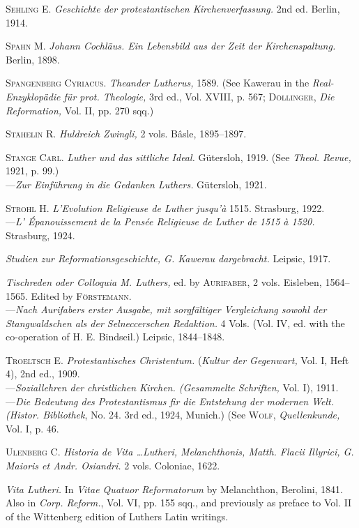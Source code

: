 \textsc{Sehling E.} \textit{Geschichte der protestantischen Kirchenverfassung.} 2nd ed.
Berlin, 1914.

\textsc{Spahn M.} \textit{Johann Cochläus. Ein Lebensbild aus der Zeit der Kirchenspaltung.}
Berlin, 1898.

\textsc{Spangenberg Cyriacus.} \textit{Theander Lutherus,} 1589. (See Kawerau in the
\textit{Real-Enzyklopädie für prot. Theologie,} 3rd ed., Vol. XVIII, p. 567; \textsc{Döllinger},
\textit{Die Reformation,} Vol. II, pp. 270 sqq.)

\textsc{Stähelin R.} \textit{Huldreich Zwingli,} 2 vols. Bâsle, 1895--1897.

\textsc{Stange Carl.} \textit{Luther und das sittliche Ideal.} Gütersloh, 1919. (See \textit{Theol.
Revue,} 1921, p. 99.) \\
---\textit{Zur Einführung in die Gedanken Luthers.} Gütersloh, 1921.

\textsc{Strohl H.} \textit{L’Evolution Religieuse de Luther jusqu'à} 1515. Strasburg,
1922. \\
---\textit{L’ Épanouissement de la Pensée Religieuse de Luther de 1515 à 1520.}
Strasburg, 1924.

\textit{Studien zur Reformationsgeschichte, G. Kawerau dargebracht.} Leipsic, 1917.

\textit{Tischreden oder Colloquia M. Luthers,} ed. by \textsc{Aurifaber,} 2 vols. Eisleben,
1564--1565. Edited by \textsc{Förstemann.} \\
---\textit{Nach Aurifabers erster Ausgabe, mit sorgfältiger Vergleichung sowohl
der Stangwaldschen als der Selneccerschen Redaktion.} 4 Vols. (Vol. IV, ed.
with the co-operation of H. E. Bindseil.) Leipsic, 1844--1848.

\textsc{Troeltsch E.} \textit{Protestantisches Christentum.} (\textit{Kultur der Gegenwart,} Vol.
I, Heft 4), 2nd ed., 1909. \\
---\textit{Soziallehren der christlichen Kirchen. (Gesammelte Schriften,} Vol. I),
1911. \\
---\textit{Die Bedeutung des Protestantismus fir die Entstehung der modernen
Welt. (Histor. Bibliothek}, No. 24. 3rd ed., 1924, Munich.) (See \textsc{Wolf,}
\textit{Quellenkunde,} Vol. I, p. 46.

\textsc{Ulenberg C.} \textit{Historia de Vita \dots Lutheri, Melanchthonis, Matth. Flacii
Illyrici, G. Maioris et Andr. Osiandri.} 2 vols. Coloniae, 1622.

\textit{Vita Lutheri.} In \textit{Vitae Quatuor Reformatorum} by Melanchthon, Berolini,
1841. Also in \textit{Corp. Reform.}, Vol. VI, pp. 155 sqq., and previously as preface
to Vol. II of the Wittenberg edition of Luthers Latin writings.

